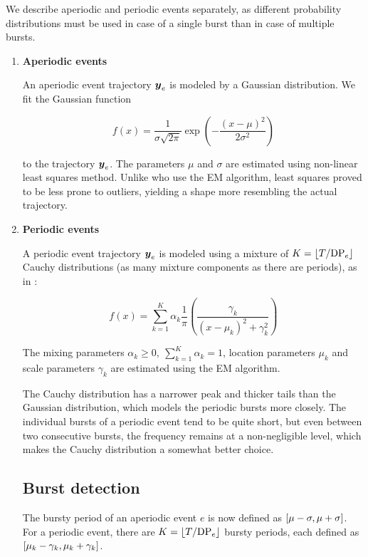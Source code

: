 We describe aperiodic and periodic events separately, as different probability distributions must be used in case of a single burst than in case of multiple bursts.

\begin{enumerate}

\item \textbf{Aperiodic events}

An aperiodic event trajectory $\vect{\traj}_{e}$ is modeled by a Gaussian distribution. We fit the Gaussian function

\begin{equation*}
	f(x) = \frac{1}{\sigma \sqrt{2 \pi}} \exp(-\frac{\left( x - \mu \right)^{2}}{2 \sigma^{2}})
\end{equation*}

to the trajectory $\vect{\traj}_{e}$. The parameters $\mu$ and $\sigma$ are estimated using non-linear least squares method. Unlike \cite{event-detection} who use the EM algorithm, least squares proved to be less prone to outliers, yielding a shape more resembling the actual trajectory.

\item \textbf{Periodic events}

A periodic event trajectory $\vect{\traj}_{e}$ is modeled using a mixture of $K = \lfloor T / \text{DP}_{e}\rfloor$ Cauchy distributions (as many mixture components as there are periods), as in \cite{health-events}:

\begin{equation*}
	f(x) = \sum_{k = 1}^{K}{\alpha_{k} \frac{1}{\pi} \left( \frac{\gamma_{k}}{\left( x - \mu_{k} \right)^{2} + \gamma_{k}^{2}} \right)}
\end{equation*}

The mixing parameters $\alpha_{k} \geq 0,\ \sum_{k = 1}^{K}{\alpha_{k}} = 1$, location parameters $\mu_{k}$ and scale parameters $\gamma_{k}$ are estimated using the EM algorithm.

The Cauchy distribution has a narrower peak and thicker tails than the Gaussian distribution, which models the periodic bursts more closely. The individual bursts of a periodic event tend to be quite short, but even between two consecutive bursts, the frequency remains at a non-negligible level, which makes the Cauchy distribution a somewhat better choice.


\subsection{Burst detection}
The bursty period of an aperiodic event $e$ is now defined as $\interval{\mu - \sigma}{\mu + \sigma}$. For a periodic event, there are $K = \lfloor T / \text{DP}_{e}\rfloor$ bursty periods, each defined as $\interval{\mu_{k} - \gamma_{k}}{\mu_{k} + \gamma_{k}}$.


\end{enumerate}
